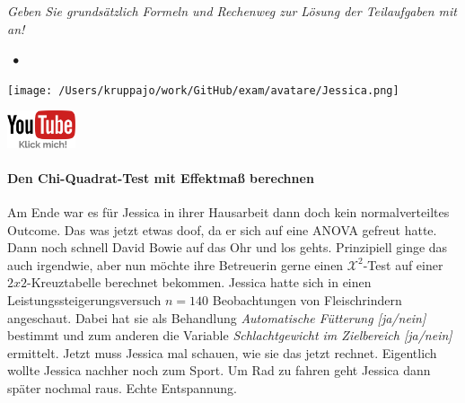 \documentclass[a4paper, 9pt]{scrartcl}\usepackage[]{graphicx}\usepackage[]{xcolor}
\begin{document}
\textit{Geben Sie grundsätzlich Formeln und Rechenweg zur Lösung der Teilaufgaben mit an!} \\[1Ex]
 

 
\ifcollection
\begin{flushright}
\tiny\vspace{-3Ex}
\textbf{\examinhaltstart}
\exammodulestat $\;\bullet$
\exammodulestatbbv 
\vspace{-4Ex}
\end{flushright}
\begin{minipage}[t]{0.5\textwidth}
\texttt{[image: /Users/kruppajo/work/GitHub/exam/avatare/Jessica.png]}
\end{minipage}
\begin{minipage}[t]{0.5\textwidth}
\hfill
\href{https://youtu.be/IcjUIoEo0rY}{\includegraphics[width = 2cm]{img/youtube}}
\end{minipage}
\vspace{-3Ex}
\fi



\ifcollection
\paragraph{Den Chi-Quadrat-Test mit Effektmaß berechnen}
\fi

Am Ende war es für Jessica in ihrer Hausarbeit dann doch kein normalverteiltes Outcome. Das was jetzt etwas doof, da er sich auf eine ANOVA gefreut hatte. Dann noch schnell David Bowie auf das Ohr und los gehts. Prinzipiell ginge das auch irgendwie, aber nun möchte ihre Betreuerin gerne einen $\mathcal{X}^2$-Test auf einer $2x2$-Kreuztabelle berechnet bekommen. Jessica hatte sich in einen Leistungssteigerungsversuch $n = 140$ Beobachtungen von Fleischrindern angeschaut. Dabei hat sie als Behandlung \textit{Automatische Fütterung [ja/nein]} bestimmt und zum anderen die Variable \textit{Schlachtgewicht im Zielbereich [ja/nein]} ermittelt. Jetzt muss Jessica mal schauen, wie sie das jetzt rechnet. Eigentlich wollte Jessica nachher noch zum Sport. Um Rad zu fahren geht Jessica dann später nochmal raus. Echte Entspannung.

\vspace{5Ex}
\end{document}
